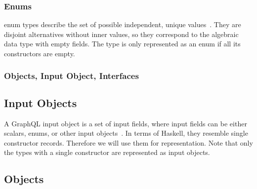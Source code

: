 \begin{frame}\frametitle{Enums}

enum types describe the set of possible independent, unique values~\cite{gql-spec}. They are disjoint alternatives without inner values, so they correspond to the algebraic data type with empty fields. The type is only represented as an enum if all its constructors are empty.


\end{frame}

\begin{frame}\frametitle{Objects, Input Object, Interfaces}

\subsection{Input Objects}

A GraphQL input object is a set of input fields, 
where input fields can be either 
scalars, enums, or other input objects~\cite{gql-spec}. 
In terms of Haskell, they resemble single constructor records. 
Therefore we will use them for representation.  Note that only the types with a single constructor are represented as input objects.


\subsection{Objects}

\end{frame}


